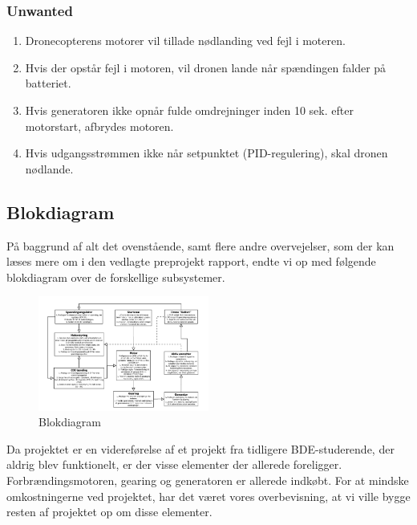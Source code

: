 \subsubsection{Unwanted}
\label{sec:kravspecifikation-4}

\begin{enumerate}[label=2.1.4.\arabic*]
\item Dronecopterens motorer vil tillade nødlanding ved fejl i moteren.
\item Hvis der opstår fejl i motoren, vil dronen lande når spændingen falder på batteriet.
\item Hvis generatoren ikke opnår fulde omdrejninger inden 10 sek. efter motorstart, afbrydes motoren.
\item Hvis udgangsstrømmen ikke når setpunktet (PID-regulering), skal dronen nødlande.
\end{enumerate}

\subsection{Blokdiagram}
\label{sec:blokdiagram-}

På baggrund af alt det ovenstående, samt flere andre overvejelser, som der kan læses mere om i den vedlagte preprojekt rapport, endte vi op med følgende blokdiagram over de forskellige subsystemer.

\begin{figure}[h]
  \centering
  \includegraphics[width=0.5\textwidth]{./figurer/int2.png}
  \caption{Blokdiagram}
  \label{fig:int2}
\end{figure}

Da projektet er en videreførelse af et projekt fra tidligere BDE-studerende, der aldrig blev funktionelt, er der visse elementer der allerede foreligger. Forbrændingsmotoren, gearing og generatoren er allerede indkøbt. For at mindske omkostningerne ved projektet, har det været vores overbevisning, at vi ville bygge resten af projektet op om disse elementer. 

